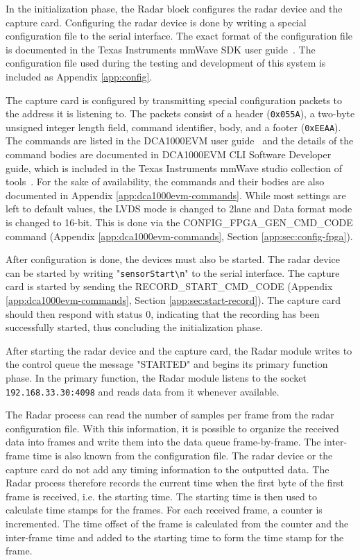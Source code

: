 In the initialization phase, the Radar block configures the radar device and the capture card.
Configuring the radar device is done by writing a special configuration file to the serial interface.
The exact format of the configuration file is documented in the Texas Instruments mmWave SDK user guide~\cite{mmwave-sdk-user-guide}.
The configuration file used during the testing and development of this system is included as Appendix \ref{app:config}.

The capture card is configured by transmitting special configuration packets to the address it is listening to.
The packets consist of a header (\texttt{0x055A}), a two-byte unsigned integer length field, command identifier, body, and a footer (\texttt{0xEEAA}).
The commands are listed in the DCA1000EVM user guide~\cite{dca1000-user-guide} and the details of the command bodies are documented in 
DCA1000EVM CLI Software Developer guide, which is included in the Texas Instruments mmWave studio collection of tools~\cite{mmwave-studio}.
For the sake of availability, the commands and their bodies are also documented in Appendix \ref{app:dca1000evm-commands}.
While most settings are left to default values, the LVDS mode is changed to 2lane and Data format mode is changed to 16-bit.
This is done via the CONFIG\_FPGA\_GEN\_CMD\_CODE command (Appendix \ref{app:dca1000evm-commands}, Section \ref{app:sec:config-fpga}).

After configuration is done, the devices must also be started.
The radar device can be started by writing "\texttt{sensorStart\textbackslash n}" to the serial interface.
The capture card is started by sending the RECORD\_START\_CMD\_CODE (Appendix \ref{app:dca1000evm-commands}, Section \ref{app:sec:start-record}).
The capture card should then respond with status 0, indicating that the recording has been successfully started,
thus concluding the initialization phase.

After starting the radar device and the capture card,
the Radar module writes to the control queue the message "STARTED" and begins its primary function phase.
In the primary function,
the Radar module listens to the socket \texttt{192.168.33.30:4098} and reads data from it whenever available.

The Radar process can read the number of samples per frame from the radar configuration file.
With this information, it is possible to organize the received data into frames and write them into the data queue frame-by-frame.
The inter-frame time is also known from the configuration file.
The radar device or the capture card do not add any timing information to the outputted data.
The Radar process therefore records the current time when the first byte of the first frame is received, i.e. the starting time.
The starting time is then used to calculate time stamps for the frames.
For each received frame, a counter is incremented. The time offset of the frame is calculated from the counter and the inter-frame time and added to the starting time
to form the time stamp for the frame.


